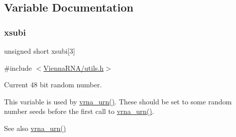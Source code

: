 \subsection{Variable Documentation}
\mbox{\label{group__utils_gaf9a866c8417afda7368bbac939ab3c47}} 
\subsubsection{\texorpdfstring{xsubi}{xsubi}}
{\footnotesize\ttfamily unsigned short xsubi\mbox{[}3\mbox{]}}



{\ttfamily \#include $<$\hyperlink{utils_8h}{Vienna\+R\+N\+A/utils.\+h}$>$}



Current 48 bit random number. 

This variable is used by \hyperlink{group__utils_ga384e256ebb295d04a14426179db0dd6e}{vrna\+\_\+urn()}. These should be set to some random number seeds before the first call to \hyperlink{group__utils_ga384e256ebb295d04a14426179db0dd6e}{vrna\+\_\+urn()}.

\begin{DoxySeeAlso}{See also}
\hyperlink{group__utils_ga384e256ebb295d04a14426179db0dd6e}{vrna\+\_\+urn()} 
\end{DoxySeeAlso}
